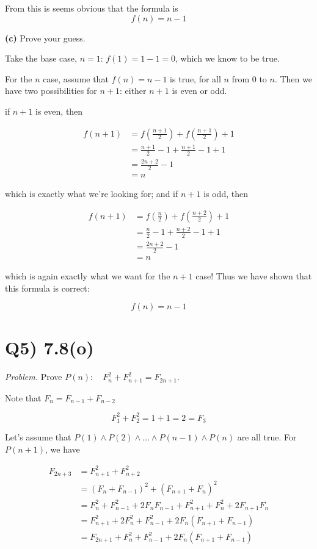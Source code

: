 \documentclass{article}
\begin{document}
From this is seems obvious that the formula is $$f(n) = n - 1$$

\textbf{(c)} Prove your guess.

Take the base case, $n = 1$: $f(1) = 1 - 1 = 0$, which we know to be true.

For the $n$ case, assume that $f(n) = n - 1$ is true, for all $n$ from $0$ to $n$. Then we have two possibilities for $n+1$: either $n+1$ is even or odd.

if $n+1$ is even, then 

\begin{align*}
  f(n+1) &= f(\frac{n+1}{2}) + f(\frac{n+1}{2}) + 1 \\
  &= \frac{n+1}{2} - 1 + \frac{n+1}{2} - 1 + 1 \\
  &= \frac{2n + 2}{2} -1 \\
  &= n
\end{align*}

which is exactly what we're looking for; and if $n + 1$ is odd, then

\begin{align*}
  f(n+1) &= f(\frac{n}{2}) + f(\frac{n+2}{2}) + 1 \\
  &= \frac{n}{2} - 1 + \frac{n+2}{2} - 1 + 1 \\
  &= \frac{2n + 2}{2} - 1 \\
  &= n
\end{align*}

which is again exactly what we want for the $n+1$ case! Thus we have shown that this formula is correct:

$$f(n) = n-1$$

\section*{Q5) 7.8(o)}
\textit{Problem.} Prove $P(n): \quad F_n^2 + F_{n+1}^2 = F_{2n+1}$.

Note that $F_n = F_{n-1} + F_{n-2}$

$$F_1^2 + F_2^2 = 1 + 1 = 2 = F_3$$

Let's assume that $P(1) \wedge P(2) \wedge \dots \wedge P(n-1) \wedge P(n)$ are all true. For $P(n+1)$, we have

\begin{align*}
  F_{2n+3} &= F_{n+1}^2 + F_{n+2}^2 \\
  &= (F_n + F_{n-1})^2 + (F_{n+1} + F_n)^2 \\
  &= F_n^2 + F_{n-1}^2 + 2F_n F_{n-1} + F_{n+1}^2 + F_n^2 + 2F_{n+1} F_n \\
  &= F_{n+1}^2 + 2F_n^2 + F_{n-1}^2 + 2F_n (F_{n+1} + F_{n-1}) \\
  &= F_{2n+1} + F_n^2 + F_{n-1}^2 + 2F_n (F_{n+1} + F_{n-1})
\end{align*}
\end{document}
